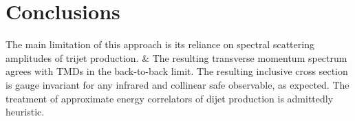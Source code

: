 \section{Conclusions}\label{sec:conclusions}

The main limitation of this approach is its reliance on spectral
scattering amplitudes of trijet production. & The resulting transverse
momentum spectrum agrees with TMDs in the back-to-back limit. The
resulting inclusive cross section is gauge invariant for any infrared
and collinear safe observable, as expected. The treatment of approximate
energy correlators of dijet production is admittedly heuristic.

